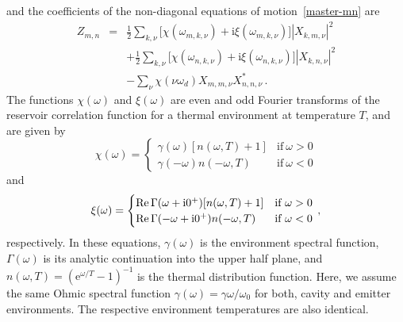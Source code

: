 \documentclass[aps,pra,twocolumn,showpacs,showkeys,10pt,nofootinbib]{revtex4-1}
\newcommand{\rme}{\mathrm e}
\newcommand{\rmi}{\mathrm i}
\renewcommand{\Re}{\mathop{{\rm Re}}}
\begin{document}
and the coefficients of the non-diagonal equations of motion~\eqref{master-mn} are
\begin{eqnarray}
  Z_{m, n} &=& \frac{1}{2} \sum_{k, \nu} \big[ \chi(\omega_{m, k, \nu}) + \rmi \xi(\omega_{m, k, \nu}) \big] |X_{k, m, \nu}|^2 \nonumber\\
    && + \frac{1}{2} \sum_{k, \nu} \big[ \chi(\omega_{n, k, \nu}) + \rmi \xi(\omega_{n, k, \nu}) \big] |X_{k, n, \nu}|^2 \nonumber\\
    && - \sum_\nu \chi(\nu \omega_d) X_{m, m, \nu} X_{n, n, \nu}^* \,.
\end{eqnarray}
The functions $\chi(\omega)$ and $\xi(\omega)$ are even and odd Fourier transforms of the reservoir correlation function for a thermal environment at temperature $T$, and are given by
\begin{equation}
  \chi(\omega) = \begin{cases} \gamma(\omega) [n(\omega, T) + 1] & \text{if}~\omega > 0 \\ \gamma(-\omega) n(-\omega, T) & \text{if}~\omega < 0 \end{cases}
\end{equation}
and
\begin{equation}
  \xi(\omega) = \begin{cases} \Re \Gamma(\omega + \rmi 0^+) [n(\omega, T) + 1] & \text{if}~\omega > 0 \\ \Re \Gamma(-\omega + \rmi 0^+) n(-\omega, T) & \text{if}~\omega < 0 \end{cases} \,,
\end{equation}
respectively.
In these equations, $\gamma(\omega)$ is the environment spectral function, $\Gamma(\omega)$ is its analytic continuation into the upper half plane, and $n(\omega,T)=(\rme^{\omega/T}-1)^{-1}$ is the thermal distribution function.
Here, we assume the same Ohmic spectral function $\gamma(\omega)=\gamma\omega/\omega_0$ for both, cavity and emitter environments.
The respective environment temperatures are also identical.
\end{document}

